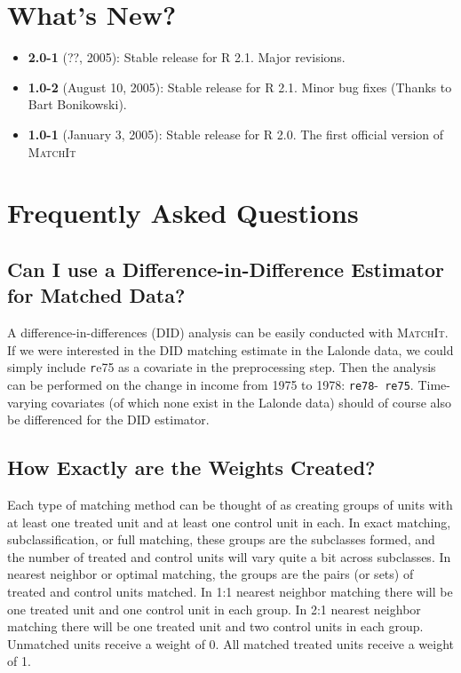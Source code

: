 \documentclass[oneside,letterpaper,titlepage]{article}
\newcommand{\MatchIt}{\textsc{MatchIt}}
\begin{document}

\section{What's New?}

\begin{itemize}
\item \textbf{2.0-1} (??, 2005): Stable release for R 2.1. Major revisions.
\item \textbf{1.0-2} (August 10, 2005): Stable release for R
  2.1. Minor bug fixes (Thanks to Bart Bonikowski).
\item \textbf{1.0-1} (January 3, 2005): Stable release for R 2.0. The
  first official version of \MatchIt
\end{itemize}




\section{Frequently Asked Questions}

\subsection{Can I use a Difference-in-Difference Estimator for Matched
  Data?}

A difference-in-differences (DID) analysis can be easily conducted
with \MatchIt.  If we were interested in the DID matching estimate in
the Lalonde data, we could simply include {\texttt re75} as a
covariate in the preprocessing step.  Then the analysis can be
performed on the change in income from 1975 to 1978: {\tt re78}-{\tt
  re75}.  Time-varying covariates (of which none exist in the Lalonde
data) should of course also be differenced for the DID estimator.

\subsection{How Exactly are the Weights Created?}
\label{subsec:weights}

Each type of matching method can be thought of as creating groups of
units with at least one treated unit and at least one control unit in
each.  In exact matching, subclassification, or full matching, these
groups are the subclasses formed, and the number of treated and
control units will vary quite a bit across subclasses.  In nearest
neighbor or optimal matching, the groups are the pairs (or sets) of
treated and control units matched.  In 1:1 nearest neighbor matching
there will be one treated unit and one control unit in each group.  In
2:1 nearest neighbor matching there will be one treated unit and two
control units in each group.  Unmatched units receive a weight of 0.
All matched treated units receive a weight of 1.
\end{document}
